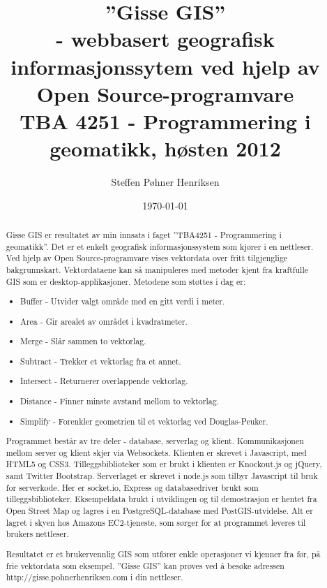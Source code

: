 \documentclass[12pt,twoside,onecolumn]{article}
\title{\textbf{''Gisse GIS''  \\- webbasert geografisk informasjonssytem ved hjelp av\\ Open Source-programvare}
\\ \normalsize TBA 4251 - Programmering i geomatikk, høsten 2012}
\author{Steffen Pøhner Henriksen}
\date{\today}
\makeatletter
\def\maketitle{%
  \null
  \thispagestyle{empty}%
  \vskip 1cm
  \begin{flushright}
    \normalfont\huge\@title\par
  \end{flushright}
  \vfil
  \begin{flushright}
    \LARGE \strut \@author \par
  \end{flushright}
  \par
  \vfil
  \vfil
  \null
  }
\makeatother
\begin{document}
\maketitle

\vspace{3cm}

\pagebreak

\begin{abstract}

	Gisse GIS er resultatet av min innsats i faget ''TBA4251 - Programmering i geomatikk''. Det er et enkelt geografisk informasjonssystem som kjører i en nettleser. Ved hjelp av Open Source-programvare vises vektordata over fritt tilgjenglige bakgrunnskart. Vektordataene kan så manipuleres med metoder kjent fra kraftfulle GIS som er desktop-applikasjoner. Metodene som støttes i dag er:
	
	\begin{itemize}
		\item Buffer - Utvider valgt område med en gitt verdi i meter.
		\item Area - Gir arealet av området i kvadratmeter.
		\item Merge - Slår sammen to vektorlag.
		\item Subtract - Trekker et vektorlag fra et annet.
		\item Intersect - Returnerer overlappende vektorlag.
		\item Distance - Finner minste avstand mellom to vektorlag.
		\item Simplify - Forenkler geometrien til et vektorlag ved Douglas-Peuker. 
	\end{itemize}
	
	Programmet består av tre deler - database, serverlag og klient. Kommunikasjonen mellom server og klient skjer via Websockets\cite{websockets}. Klienten er skrevet i Javascript, med HTML5 og CSS3. Tilleggsbiblioteker som er brukt i klienten er Knockout.js\cite{knockout} og jQuery\cite{jquery}, samt Twitter Bootstrap\cite{bootstrap}. Serverlaget er skrevet i node.js\cite{node} som tilbyr Javascript til bruk for serverkode. Her er socket.io\cite{socket}, Express og databasedriver brukt som tilleggsbiblioteker. Eksempeldata brukt i utviklingen og til demostrasjon er hentet fra Open Street Map og lagres i en PostgreSQL-database med PostGIS-utvidelse\cite{postgis}. Alt er lagret i skyen hos Amazons EC2-tjeneste\cite{ec2}, som sørger for at programmet leveres til brukers nettleser. 
	
	Resultatet er et brukervennlig GIS som utfører enkle operasjoner vi kjenner fra før, på frie vektordata som eksempel. ''Gisse GIS'' kan prøves ved å besøke adressen http://gisse.pohnerhenriksen.com i din nettleser.
	
\end{abstract}
\newpage
\end{document}
